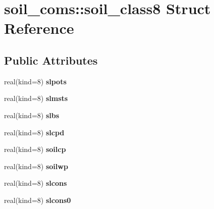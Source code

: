\hypertarget{structsoil__coms_1_1soil__class8}{
\section{soil\_\-coms::soil\_\-class8 Struct Reference}
\label{structsoil__coms_1_1soil__class8}
}
\subsection*{Public Attributes}
\begin{DoxyCompactItemize}
\item 
\hypertarget{structsoil__coms_1_1soil__class8_a0db3756007c4b365d4cc816c85c68e87}{
real(kind=8) {\bfseries slpots}}
\label{structsoil__coms_1_1soil__class8_a0db3756007c4b365d4cc816c85c68e87}

\item 
\hypertarget{structsoil__coms_1_1soil__class8_a827d9a9a6493846f2c27bf315c732a22}{
real(kind=8) {\bfseries slmsts}}
\label{structsoil__coms_1_1soil__class8_a827d9a9a6493846f2c27bf315c732a22}

\item 
\hypertarget{structsoil__coms_1_1soil__class8_ad2aaa2b7e20f2b6e0fd7346d7dba36c8}{
real(kind=8) {\bfseries slbs}}
\label{structsoil__coms_1_1soil__class8_ad2aaa2b7e20f2b6e0fd7346d7dba36c8}

\item 
\hypertarget{structsoil__coms_1_1soil__class8_a7f69d5e15678d754e43256681d09a81a}{
real(kind=8) {\bfseries slcpd}}
\label{structsoil__coms_1_1soil__class8_a7f69d5e15678d754e43256681d09a81a}

\item 
\hypertarget{structsoil__coms_1_1soil__class8_a4a80dd61d096c8335a2c9a147e703e83}{
real(kind=8) {\bfseries soilcp}}
\label{structsoil__coms_1_1soil__class8_a4a80dd61d096c8335a2c9a147e703e83}

\item 
\hypertarget{structsoil__coms_1_1soil__class8_abba0d916f641d061902129070cf12a82}{
real(kind=8) {\bfseries soilwp}}
\label{structsoil__coms_1_1soil__class8_abba0d916f641d061902129070cf12a82}

\item 
\hypertarget{structsoil__coms_1_1soil__class8_aca739f925f6f52452efcd94cab49867a}{
real(kind=8) {\bfseries slcons}}
\label{structsoil__coms_1_1soil__class8_aca739f925f6f52452efcd94cab49867a}

\item 
\hypertarget{structsoil__coms_1_1soil__class8_aa300207fe531601c4d8a09ce743a9b43}{
real(kind=8) {\bfseries slcons0}}
\label{structsoil__coms_1_1soil__class8_aa300207fe531601c4d8a09ce743a9b43}


\end{DoxyCompactItemize}
